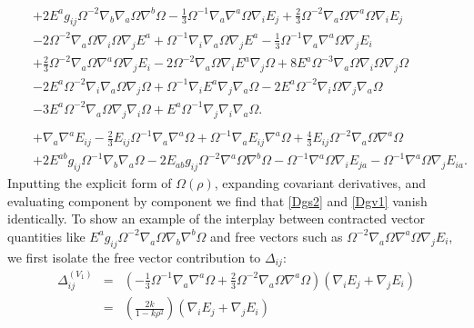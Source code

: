 \documentclass[10pt,letterpaper]{article}
\numberwithin{equation}{section}
\begin{document}
\begin{eqnarray}
&& + 2 E^{a} g_{ij} \Omega^{-2} \nabla_{b}\nabla_{a}\Omega \nabla^{b}\Omega
-  \tfrac{1}{3} \Omega^{-1} \nabla_{a}\nabla^{a}\Omega \nabla_{i}E_{j}
+ \tfrac{2}{3} \Omega^{-2} \nabla_{a}\Omega \nabla^{a}\Omega \nabla_{i}E_{j}\nonumber\\
&& - 2 \Omega^{-2} \nabla_{a}\Omega \nabla_{i}\Omega \nabla_{j}E^{a}
+ \Omega^{-1} \nabla_{i}\nabla_{a}\Omega \nabla_{j}E^{a}
-  \tfrac{1}{3} \Omega^{-1} \nabla_{a}\nabla^{a}\Omega \nabla_{j}E_{i}\nonumber\\
&& + \tfrac{2}{3} \Omega^{-2} \nabla_{a}\Omega \nabla^{a}\Omega \nabla_{j}E_{i}
- 2 \Omega^{-2} \nabla_{a}\Omega \nabla_{i}E^{a} \nabla_{j}\Omega
+ 8 E^{a} \Omega^{-3} \nabla_{a}\Omega \nabla_{i}\Omega \nabla_{j}\Omega\nonumber\\
&& - 2 E^{a} \Omega^{-2} \nabla_{i}\nabla_{a}\Omega \nabla_{j}\Omega
+ \Omega^{-1} \nabla_{i}E^{a} \nabla_{j}\nabla_{a}\Omega
- 2 E^{a} \Omega^{-2} \nabla_{i}\Omega \nabla_{j}\nabla_{a}\Omega\nonumber\\
&& - 3 E^{a} \Omega^{-2} \nabla_{a}\Omega \nabla_{j}\nabla_{i}\Omega
+ E^{a} \Omega^{-1} \nabla_{j}\nabla_{i}\nabla_{a}\Omega.
\label{Dgv1} \\
\nonumber\\
&&+\nabla_{a}\nabla^{a}E_{ij}
 -  \tfrac{2}{3} E_{ij} \Omega^{-1} \nabla_{a}\nabla^{a}\Omega
 + \Omega^{-1} \nabla_{a}E_{ij} \nabla^{a}\Omega
 + \tfrac{4}{3} E_{ij} \Omega^{-2} \nabla_{a}\Omega \nabla^{a}\Omega\nonumber\\
&& + 2 E^{ab} g_{ij} \Omega^{-1} \nabla_{b}\nabla_{a}\Omega
 - 2 E_{ab} g_{ij} \Omega^{-2} \nabla^{a}\Omega \nabla^{b}\Omega
 -  \Omega^{-1} \nabla^{a}\Omega \nabla_{i}E_{ja}
 -  \Omega^{-1} \nabla^{a}\Omega \nabla_{j}E_{ia}.
\end{eqnarray}
Inputting the explicit form of $\Omega(\rho)$, expanding covariant derivatives, and evaluating component by component we find that \eqref{Dgs2} and \eqref{Dgv1} vanish identically. To show an example of the interplay between contracted vector quantities like $E^{a} g_{ij} \Omega^{-2} \nabla_{a}\Omega \nabla_{b}\nabla^{b}\Omega$ and free vectors such as $\Omega^{-2} \nabla_{a}\Omega \nabla^{a}\Omega \nabla_{j}E_{i}$, we first isolate the free vector contribution to $\Delta_{ij}$:
\begin{eqnarray}
\Delta_{ij}^{(V_1)}&=& \left(-\tfrac13  \Omega^{-1} \nabla_{a}\nabla^{a}\Omega
+ \tfrac23\Omega^{-2} \nabla_{a}\Omega \nabla^{a}\Omega\right) (\nabla_{i}E_{j}+\nabla_j E_i)
\nonumber\\
&=&\left( \frac{2k}{1-k\rho^2}\right) (\nabla_{i}E_{j}+\nabla_j E_i)
\label{Dgv12}
\end{eqnarray}
\end{document}
